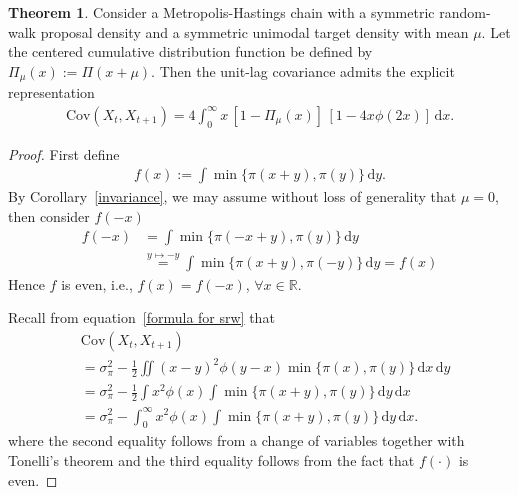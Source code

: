 \documentclass[conference]{IEEEtran}
\newcommand{\df}{\mathrm{d}}
\theoremstyle{definition}
\newtheorem{theorem}{Theorem}[section]
\begin{document}
\begin{theorem}\label{sym unimodal}
Consider a Metropolis-Hastings chain with a symmetric random-walk proposal density 
and a symmetric unimodal target density with mean $\mu$. 
Let the centered cumulative distribution function be defined by $\Pi_\mu(x):=\Pi(x+\mu)$. 
Then the unit-lag covariance admits the explicit representation
\begin{align}\label{formula sym unimodal}
\mathrm{Cov}(X_t,X_{t+1})
= 4 \int_0^\infty x \,[1-\Pi_\mu(x)]\,[1-4x\phi(2x)]\,\df x.
\end{align}
\end{theorem}
\begin{proof}
First define
\begin{align*}
f(x):=\int \min\{\pi(x+y),\pi(y)\}\,\df y.
\end{align*}
By Corollary~\ref{invariance}, we may assume without loss of generality that $\mu=0$, then consider \(f(-x)\)
\[
\begin{aligned}
f(-x)
&=\int \min\{\pi(-x+y),\pi(y)\}\,\mathrm{d}y
\\
&\overset{y\mapsto -y}{=}\int \min\{\pi(x+y),\pi(-y)\}\,\mathrm{d}y
= f(x)
\end{aligned}
\]
Hence $f$ is even, i.e., $f(x)=f(-x)$, $\forall x\in\mathbb{R}$.

Recall from equation~\eqref{formula for srw} that
\begin{align}\label{even used}
&\mathrm{Cov}(X_t,X_{t+1})\nonumber\\
&= \sigma_{\pi}^2
-\tfrac{1}{2}\iint (x-y)^2 \phi(y-x)\min\{\pi(x),\pi(y)\}\,\df x\,\df y \nonumber\\
&= \sigma_{\pi}^2
-\tfrac{1}{2}\int x^2 \phi(x)\int \min\{\pi(x+y),\pi(y)\}\,\df y\,\df x\nonumber\\
&=\sigma_{\pi}^2
-\int_0^\infty x^2 \phi(x)\int \min\{\pi(x+y),\pi(y)\}\,\df y\,\df x.
\end{align}
where the second equality follows from a change of variables together with Tonelli's theorem \cite{Tonelli} and the third equality follows from the fact that \(f(\cdot)\) is even. 


\end{proof}
\end{document}
